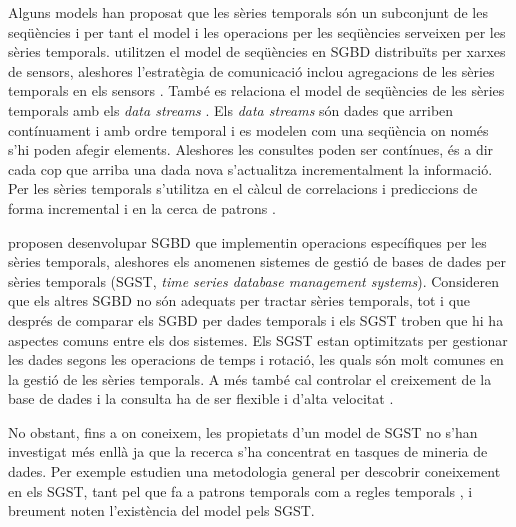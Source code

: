 Alguns models han proposat que les sèries temporals són un subconjunt de les seqüències \parencite{seshadri96:thesis} i per tant el model i les operacions per les seqüències \parencite{seshadri95} serveixen per les sèries temporals. 
\textcite{bonnet01} utilitzen el model de seqüències en SGBD distribuïts per xarxes de sensors, aleshores l'estratègia de comunicació inclou agregacions de les sèries temporals en els sensors \parencite{demers03}.
També es relaciona el model de seqüències de les sèries temporals amb els \emph{data streams} \parencite{babcock02,jagadish95}. Els \emph{data streams} són dades que arriben contínuament i amb ordre temporal i es modelen com una seqüència on només s'hi poden afegir elements. Aleshores les consultes poden ser contínues, és a dir cada cop que arriba una dada nova s'actualitza incrementalment la informació. Per les sèries temporals s'utilitza en el càlcul de correlacions i prediccions de forma incremental \parencite{yi00} i en la cerca de patrons \parencite{bai05}.


\textcite{dreyer94} proposen desenvolupar SGBD que implementin operacions específiques per les sèries temporals, aleshores els anomenen sistemes de gestió de bases de dades per sèries temporals (SGST, \emph{time series database management systems}). Consideren que els altres SGBD no són adequats per tractar sèries temporals, tot i que després de comparar els SGBD per dades temporals i els SGST \parencite{schmidt95} troben que hi ha aspectes comuns entre els dos sistemes.
Els SGST estan optimitzats per gestionar les dades segons les operacions de temps i rotació, les quals són molt comunes en la gestió de les sèries temporals.  A més també cal controlar el creixement de la base de dades i la consulta ha de ser flexible i d'alta velocitat \parencite{keogh10:isax}. 

No obstant, fins a on coneixem, les propietats d'un model de SGST no s'han investigat més enllà  ja que la recerca s'ha concentrat en tasques de mineria de dades. Per exemple \textcite{last01} estudien una metodologia general per descobrir coneixement en els SGST, tant pel que fa a 
patrons temporals %
com a regles temporals%
, i breument noten l'existència del model \cite{dreyer94} pels SGST.



